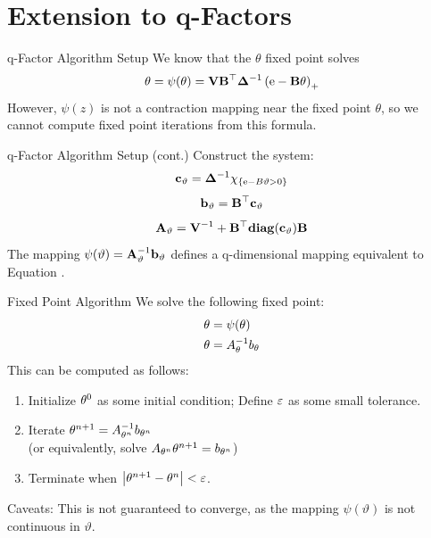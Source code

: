 \documentclass[11pt,leqno]{beamer}
\begin{document}
\section{Extension to q-Factors}

\begin{frame}{q-Factor Algorithm Setup}
We know that the $\theta$ fixed point solves
\begin{equation}
\theta = \psi(\theta) =\mathbf{V} \mathbf{B}^\top \bm{\Delta}^{-1} \left(\mathrm{e} - \mathbf{B} \theta\right)_+
\end{equation}
However, $\psi(z)$ is not a contraction mapping near the fixed point $\theta$, so we cannot compute fixed point iterations from this formula.

\end{frame}


\begin{frame}{q-Factor Algorithm Setup (cont.)}
Construct the system:
\begin{equation}
\mathbf{c}_\vartheta = \bm{\Delta}^{-1}\chi_{\{\mathrm{e} - B \vartheta>0\}}
\end{equation}
\begin{equation}
\mathbf{b}_\vartheta = \mathbf{B}^\top \mathbf{c}_\vartheta
\end{equation}
\begin{equation}
\mathbf{A}_\vartheta = \mathbf{V}^{-1} + \mathbf{B}^\top\mathbf{diag}(\mathbf{c}_\vartheta)\mathbf{B}
\end{equation}
The mapping $\psi(\vartheta) = \mathbf{A}_\vartheta^{-1} \mathbf{b}_\vartheta$
defines a q-dimensional mapping equivalent to Equation .
\end{frame}

\begin{frame}{Fixed Point Algorithm}
We solve the following fixed point:
\[
\begin{aligned}
\theta &= \psi(\theta)\\
\theta &= A_\theta^{-1} b_\theta
\end{aligned}
\]
This can be computed as follows:
\begin{enumerate}
\item Initialize $\theta^0$ as some initial condition; Define $\varepsilon$ as some small tolerance.
\item Iterate $\theta^{n+1} = A_{\theta^n}^{-1} b_{\theta^n}$\\ (or equivalently, solve $A_{\theta^n}\theta^{n+1} = b_{\theta^n}$)
\item Terminate when $\left| {\theta^{n+1}-\theta^{n}} \right|<\varepsilon$.
\end{enumerate}
Caveats: This is not guaranteed to converge, as the mapping $\psi(\vartheta)$ is not continuous in $\vartheta$.
\end{frame}
\end{document}
